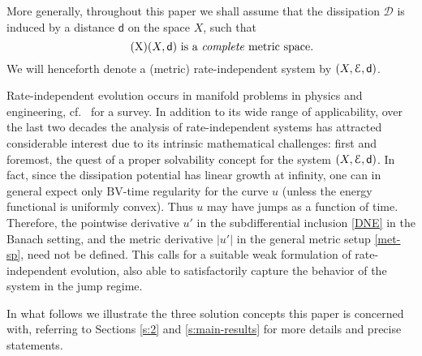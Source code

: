\documentclass[a4paper,10pt,reqno]{amsart} %
\numberwithin{equation}{section}
\newcommand{\Xs}{X}
\newcommand{\BV}{\mathrm{BV}}
\newcommand{\mdn}{\mathsf{d}}
\newcommand{\RIS}{(\Xs,\calE,\mdn)}
\begin{document}
More generally, throughout
 this paper  we shall assume that 
 the dissipation $\mathcal{D}$ is induced by a distance $\mdn$ on 
 the space $\Xs$, such that
\begin{equation}
\label{met-sp}
\tag{$\mathrm{X}$}
\text{$(\Xs,\mdn)$ is a \emph{complete} metric space}.
\end{equation}
We will henceforth denote a (metric) rate-independent system by $\RIS$. 
%
\par
Rate-independent evolution occurs in manifold  problems in physics and engineering, cf.\ \cite{Miel05ERIS,MieRouBOOK} for a survey. In addition to its wide range of applicability, over the last two decades the analysis of rate-independent systems has attracted considerable interest due to its intrinsic mathematical challenges: first and foremost, the quest of a proper solvability concept for the system $\RIS$. In fact, since the dissipation potential has linear growth at infinity, one can in general expect only $\BV$-time regularity for the curve $u$ (unless the energy functional is uniformly convex). Thus $u$ may  have jumps as a function of time. Therefore, the pointwise derivative $u'$ in the subdifferential inclusion \eqref{DNE} in the  Banach setting, and the metric  derivative $|u'|$ in the general metric setup \eqref{met-sp}, need not be defined. This calls for  a suitable weak formulation of rate-independent evolution, also able to satisfactorily capture the behavior of the system in the jump regime. 
\par
In what follows we illustrate the three solution concepts this paper is concerned with, referring to Sections \ref{s:2} and \ref{s:main-results} for more details and precise statements.
\end{document}
